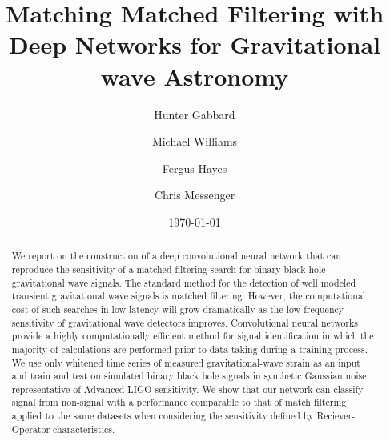 \documentclass[%
showpacs,
 amsmath,amssymb,
 aps,
 twocolumn,
 prl,
 reprint,
floatfix,
]{revtex4-1}
\newcommand{\dcc}{LIGO-P1700378}
\begin{document}

%
%
\title{Matching Matched Filtering with Deep Networks for Gravitational wave Astronomy}

\author{Hunter Gabbard}
\author{Michael Williams}
\author{Fergus Hayes}
\author{Chris Messenger}

\date{\today}%


%
%
\begin{abstract} 
%
We report on the construction of a deep convolutional neural network that can
reproduce the sensitivity of a matched-filtering search for binary black hole
gravitational wave signals. The standard method for the detection of well
modeled transient gravitational wave signals is matched filtering. However,
the computational cost of such searches in low latency will grow dramatically
as the low frequency sensitivity of gravitational wave detectors improves.
Convolutional neural networks provide a highly computationally efficient method
for signal identification in which the majority of calculations are performed
prior to data taking during a training process. We use only whitened time
series of measured gravitational-wave strain as an input and train and test on simulated binary black hole
signals in synthetic Gaussian noise representative of Advanced LIGO sensitivity. 
We show that our network can classify signal from non-signal with a performance
comparable to that of match filtering applied to the same datasets when considering the sensitivity 
defined by Reciever-Operator characteristics.

%
\end{abstract}



\end{document}
